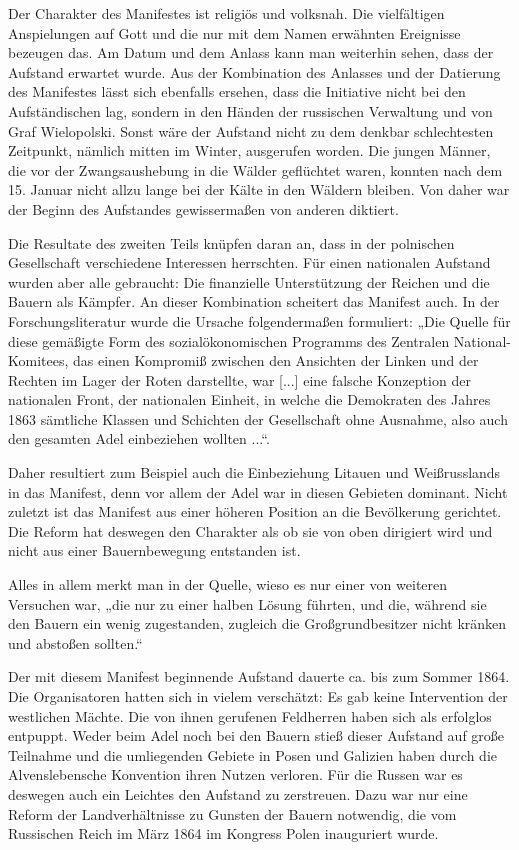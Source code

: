 \documentclass[12pt,headsepline,a4paper]{scrartcl}
\begin{document}
Der Charakter des Manifestes ist religiös und volksnah. Die vielfältigen Anspielungen auf Gott und
die nur mit dem Namen erwähnten Ereignisse bezeugen das. Am Datum und dem Anlass kann man
weiterhin sehen, dass der Aufstand erwartet wurde. Aus der Kombination des Anlasses und der
Datierung des Manifestes lässt sich ebenfalls ersehen, dass die Initiative nicht bei den
Aufständischen lag, sondern in den Händen der russischen Verwaltung und von Graf Wielopolski.
Sonst wäre der Aufstand nicht zu dem denkbar schlechtesten Zeitpunkt, nämlich mitten im Winter,
ausgerufen worden. Die jungen Männer, die vor der Zwangsaushebung in die Wälder geflüchtet
waren, konnten nach dem 15. Januar nicht allzu lange bei der Kälte in den Wäldern bleiben. Von
daher war der Beginn des Aufstandes gewissermaßen von anderen diktiert.

Die Resultate des zweiten Teils knüpfen daran an, dass in der polnischen Gesellschaft verschiedene
Interessen herrschten. Für einen nationalen Aufstand wurden aber alle gebraucht: Die finanzielle
Unterstützung der Reichen und die Bauern als Kämpfer. An dieser Kombination scheitert das
Manifest auch. In der Forschungsliteratur wurde die Ursache folgendermaßen formuliert: „Die
Quelle für diese gemäßigte Form des sozialökonomischen Programms des Zentralen National-Komitees, das einen Kompromiß zwischen den Ansichten der Linken und der Rechten im Lager der
Roten darstellte, war [...] eine falsche Konzeption der nationalen Front, der nationalen Einheit, in
welche die Demokraten des Jahres 1863 sämtliche Klassen und Schichten der Gesellschaft ohne
Ausnahme, also auch den gesamten Adel einbeziehen wollten ...“.\autocite[23]{kowalski1954}

Daher resultiert zum Beispiel auch die Einbeziehung Litauen und Weißrusslands in das Manifest,
denn vor allem der Adel war in diesen Gebieten dominant. Nicht zuletzt ist das Manifest aus einer
höheren Position an die Bevölkerung gerichtet. Die Reform hat deswegen den Charakter als ob sie
von oben dirigiert wird und nicht aus einer Bauernbewegung entstanden ist.

Alles in allem merkt man in der Quelle, wieso es nur einer von weiteren Versuchen war, „die nur zu
einer halben Lösung führten, und die, während sie den Bauern ein wenig zugestanden, zugleich die
Großgrundbesitzer nicht kränken und abstoßen sollten.“\autocite[23]{kowalski1954}

Der mit diesem Manifest beginnende Aufstand dauerte ca. bis zum Sommer 1864. Die
Organisatoren hatten sich in vielem verschätzt: Es gab keine Intervention der westlichen Mächte.
Die von ihnen gerufenen Feldherren haben sich als erfolglos entpuppt. Weder beim Adel noch bei
den Bauern stieß dieser Aufstand auf große Teilnahme und die umliegenden Gebiete in Posen und
Galizien haben durch die Alvenslebensche Konvention ihren Nutzen verloren.
Für die Russen war es deswegen auch ein Leichtes den Aufstand zu zerstreuen. Dazu war nur eine
Reform der Landverhältnisse zu Gunsten der Bauern notwendig, die vom Russischen Reich im
März 1864 im Kongress Polen inauguriert wurde.

\printbibliography
\end{document}
